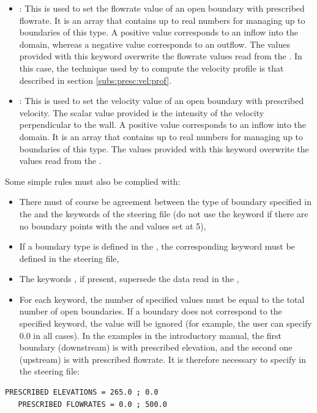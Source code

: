 \begin{itemize}
\item {}:
This is used to set the flowrate value of an open boundary with prescribed
flowrate.
It is an array that contains up to  real numbers for managing up
to  boundaries of this type.
A positive value corresponds to an inflow into the domain, whereas a negative
value corresponds to an outflow.
The values provided with this keyword overwrite the flowrate values read
from the .
In this case, the technique used by  to compute the velocity profile
is that described in section \ref{subs:presc:vel:prof}.

\item {}:
This is used to set the velocity value of an open boundary with prescribed
velocity.
The scalar value provided is the intensity of the velocity perpendicular
to the wall.
A positive value corresponds to an inflow into the domain.
It is an array that contains up to  real numbers for managing up
to  boundaries of this type.
The values provided with this keyword overwrite the values read from the
.
\end{itemize}

Some simple rules must also be complied with:

\begin{itemize}
\item There must of course be agreement between the type of boundary specified
in the  and the keywords of the steering file
(do not use the keyword  if there are no boundary
points with the  and  values set at 5),

\item If a boundary type is defined in the ,
the corresponding keyword must be defined in the steering file,

\item The keywords , if present,
supersede the data read in the ,

\item For each keyword, the number of specified values must be equal
to the total number of open boundaries.
If a boundary does not correspond to the specified keyword, the value will be
ignored (for example, the user can specify 0.0 in all cases).
In the examples in the introductory manual, the first boundary (downstream)
is with prescribed elevation, and the second one (upstream) is with prescribed
flowrate.
It is therefore necessary to specify in the steering file:
\end{itemize}
\begin{lstlisting}[language=bash]
   PRESCRIBED ELEVATIONS = 265.0 ; 0.0
   PRESCRIBED FLOWRATES = 0.0 ; 500.0
\end{lstlisting}

